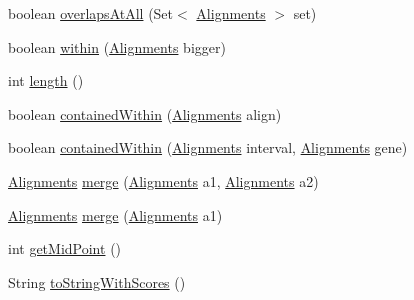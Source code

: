 \begin{DoxyCompactItemize}
\item 
boolean \hyperlink{classbroad_1_1pda_1_1datastructures_1_1_alignments_a1f6955f39715a75f8ece9d6248ca44bf}{overlaps\+At\+All} (Set$<$ \hyperlink{classbroad_1_1pda_1_1datastructures_1_1_alignments}{Alignments} $>$ set)
\item 
boolean \hyperlink{classbroad_1_1pda_1_1datastructures_1_1_alignments_a15edf8a13099f1c0c71d9562d6c40dbe}{within} (\hyperlink{classbroad_1_1pda_1_1datastructures_1_1_alignments}{Alignments} bigger)
\item 
int \hyperlink{classbroad_1_1pda_1_1datastructures_1_1_alignments_a1e008aad6fcf252184b0b623ac992ac3}{length} ()
\item 
boolean \hyperlink{classbroad_1_1pda_1_1datastructures_1_1_alignments_addcedc7cdc38187c24a5bb5077cb9112}{contained\+Within} (\hyperlink{classbroad_1_1pda_1_1datastructures_1_1_alignments}{Alignments} align)
\item 
boolean \hyperlink{classbroad_1_1pda_1_1datastructures_1_1_alignments_a6c884178476eec0654a4a3193aee5fea}{contained\+Within} (\hyperlink{classbroad_1_1pda_1_1datastructures_1_1_alignments}{Alignments} interval, \hyperlink{classbroad_1_1pda_1_1datastructures_1_1_alignments}{Alignments} gene)
\item 
\hyperlink{classbroad_1_1pda_1_1datastructures_1_1_alignments}{Alignments} \hyperlink{classbroad_1_1pda_1_1datastructures_1_1_alignments_ad139a49c4b30bf32705834f0e79e2789}{merge} (\hyperlink{classbroad_1_1pda_1_1datastructures_1_1_alignments}{Alignments} a1, \hyperlink{classbroad_1_1pda_1_1datastructures_1_1_alignments}{Alignments} a2)
\item 
\hyperlink{classbroad_1_1pda_1_1datastructures_1_1_alignments}{Alignments} \hyperlink{classbroad_1_1pda_1_1datastructures_1_1_alignments_a8fb9886ba4b7b464998e89f49352da2e}{merge} (\hyperlink{classbroad_1_1pda_1_1datastructures_1_1_alignments}{Alignments} a1)
\item 
int \hyperlink{classbroad_1_1pda_1_1datastructures_1_1_alignments_acdc1bd0519bc4c35f4c563a6e100a066}{get\+Mid\+Point} ()
\item 
String \hyperlink{classbroad_1_1pda_1_1datastructures_1_1_alignments_af91bd395ae26f2f26e6921188e606581}{to\+String\+With\+Scores} ()
\end{DoxyCompactItemize}
